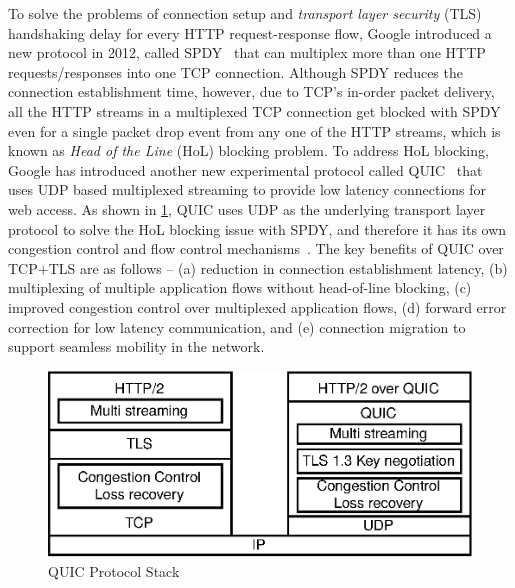 To solve the problems of connection setup and {\em transport layer security} (TLS) handshaking delay for every HTTP request-response flow, Google introduced a new protocol in 2012, called  SPDY~\cite{spdy,erman2015towards} that can multiplex more than one HTTP requests/responses into one TCP connection. Although SPDY reduces the connection establishment time, however, due to TCP's in-order packet delivery, all the HTTP streams in a multiplexed TCP connection get blocked with SPDY even for a single packet drop event from any one of the HTTP streams, which is known as {\em Head of the Line} (HoL) blocking problem. To address HoL blocking, Google has introduced another new experimental protocol called QUIC~\cite{roskind2015quic,cui2017innovating,quicisquic} that uses UDP based multiplexed streaming to provide low latency connections for web access. As shown in \fig\ref{fig:quic-protocolstack}, QUIC uses UDP as the underlying transport layer protocol to solve the HoL blocking issue with SPDY, and therefore it has its own congestion control and flow control mechanisms~\cite{cui2017innovating,roskind2015quic}. The key benefits of QUIC over TCP+TLS are as follows -- (a) reduction in connection establishment latency, (b) multiplexing of multiple application flows without head-of-line blocking, (c) improved congestion control over multiplexed application flows, (d) forward error correction for low latency communication, and (e) connection migration to support seamless mobility in the network. 

\begin{figure}[!t]
	\centering
	\includegraphics[width=0.7\linewidth]{img/quic-protocolstack}
	\caption{QUIC Protocol Stack}
	\label{fig:quic-protocolstack}
\end{figure}


